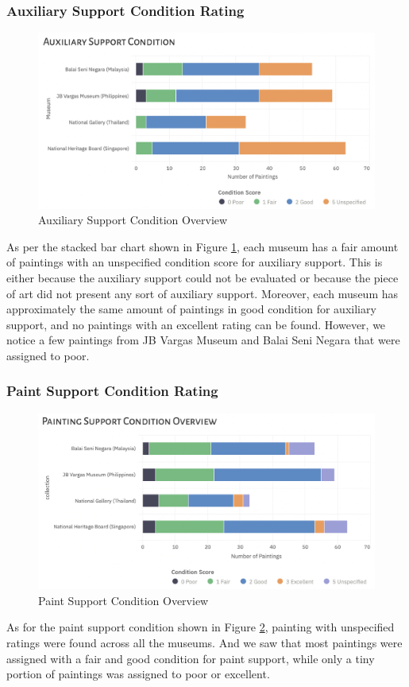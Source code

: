 \documentclass[11pt, oneside]{article}
\begin{document}
\subsubsection{Auxiliary Support Condition Rating}
\begin{figure}[H]
    \centering
    \includegraphics[scale=0.5]{images/aux_cond.png}
    \caption{Auxiliary Support Condition Overview}
    \label{aux_cond}
\end{figure}
As per the stacked bar chart shown in Figure \ref{aux_cond}, each museum has a fair amount of paintings with an unspecified condition score for auxiliary support. This is either because the auxiliary support could not be evaluated or because the piece of art did not present any sort of auxiliary support. Moreover, each museum has approximately the same amount of paintings in good condition for auxiliary support, and no paintings with an excellent rating can be found. However, we notice a few paintings from JB Vargas Museum and Balai Seni Negara that were assigned to poor.

\subsubsection{Paint Support Condition Rating}
\begin{figure}[H]
    \centering
    \includegraphics[scale=0.5]{images/support_cond.png}
    \caption{Paint Support Condition Overview}
    \label{support_cond}
\end{figure}
As for the paint support condition shown in Figure \ref{support_cond}, painting with unspecified ratings were found across all the museums. And we saw that most paintings were assigned with a fair and good condition for paint support, while only a tiny portion of paintings was assigned to poor or excellent.
\end{document}
